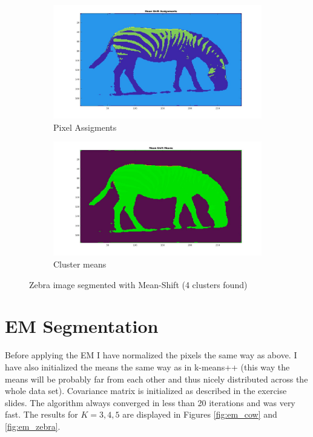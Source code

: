 \documentclass[paper=a4, fontsize=11pt]{scrartcl} %
\numberwithin{equation}{section} %
\numberwithin{figure}{section} %
\numberwithin{table}{section} %
\begin{document}
\begin{figure}
\centering
\begin{subfigure}{.5\textwidth}
  \centering
  \includegraphics[width=\linewidth]{zebra/ms_ass.jpg}
  \caption{Pixel Assigments}
\end{subfigure}%
\begin{subfigure}{.5\textwidth}
  \centering
  \includegraphics[width=\linewidth]{zebra/ms_means.jpg}
  \caption{Cluster means}
\end{subfigure}
\caption{Zebra image segmented with Mean-Shift (4 clusters found)}
\label{fig:ms_zebra}
\end{figure}


\section{EM Segmentation}

Before applying the EM I have normalized the pixels the same way as above. I have also initialized the means the same way as in k-means++ (this way the means will be probably far from each other and thus nicely distributed across the whole data set). Covariance matrix is initialized as described in the exercise slides. The algorithm always converged in less than 20 iterations and was very fast. The results for $K=3,4,5$ are displayed in Figures \ref{fig:em_cow} and \ref{fig:em_zebra}.
\end{document}
